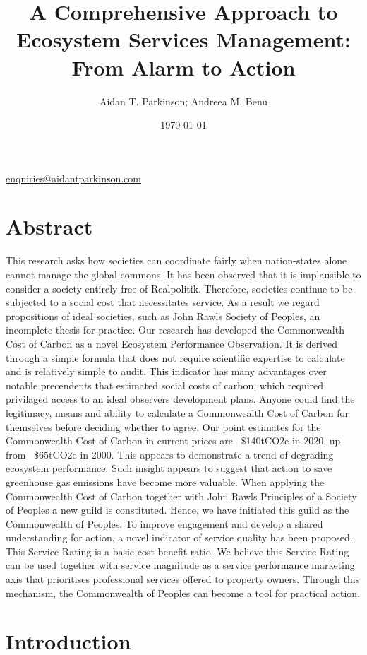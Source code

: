 \documentclass[12pt, oneside]{article}   	%
\title{A Comprehensive Approach to Ecosystem Services Management: From Alarm to Action}
\author{Aidan T. Parkinson; Andreea M. Benu}
\date{\today}							%
\begin{document}
\maketitle
\begin{center}
\href{mailto:enquiries@aidantparkinson.com}{enquiries@aidantparkinson.com}
\end{center}

\section{Abstract}
This research asks how societies can coordinate fairly when nation-states alone cannot manage the global commons.
It has been observed that it is implausible to consider a society entirely free of Realpolitik.
Therefore, societies continue to be subjected to a social cost that necessitates service.
As a result we regard propositions of ideal societies, such as John Rawls Society of Peoples, an incomplete thesis for practice.
Our research has developed the Commonwealth Cost of Carbon as a novel Ecosystem Performance Observation.
It is derived through a simple formula that does not require scientific expertise to calculate and is relatively simple to audit.
This indicator has many advantages over notable precendents that estimated social costs of carbon, which required privilaged access to an ideal observers development plans.
Anyone could find the legitimacy, means and ability to calculate a Commonwealth Cost of Carbon for themselves before deciding whether to agree.
Our point estimates for the Commonwealth Cost of Carbon in current prices are ~\$140tCO2e in 2020, up from ~\$65tCO2e in 2000.
This appears to demonstrate a trend of degrading ecosystem performance.
Such insight appears to suggest that action to save greenhouse gas emissions have become more valuable.
When applying the Commonwealth Cost of Carbon together with John Rawls Principles of a Society of Peoples a new guild is constituted.
Hence, we have initiated this guild as the Commonwealth of Peoples.
To improve engagement and develop a shared understanding for action, a novel indicator of service quality has been proposed.
This Service Rating is a basic cost-benefit ratio.
We believe this Service Rating can be used together with service magnitude as a service performance marketing axis that prioritises professional services offered to property owners.
Through this mechanism, the Commonwealth of Peoples can become a tool for practical action.

\section{Introduction}
\end{document}
